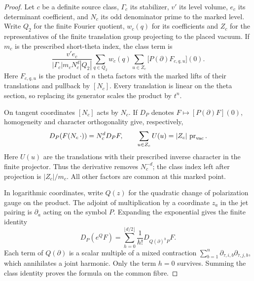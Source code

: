 \begin{proof}
Let \(c\) be a definite source class, \(\Gamma_c\) its stabilizer,
\(v'\) its level volume, \(e_c\) its determinant coefficient,
and \(N_c\) its odd denominator prime to the marked level. Write
\(Q_2\) for the finite Fourier quotient, \(w_c(q)\) for its
coefficients and \(Z_c\) for the representatives of the finite
translation group projecting to the placed vacuum. If \(m_c\)
is the prescribed short-theta index, the class term is
\[
 \frac{v'e_c}{|\Gamma_c|m_cN_c^{d}|Q_2|}
 \sum_{q\in Q_2}w_c(q)\sum_{u\in Z_c}
                \bigl[P(\partial)F_{c,q,u}\bigr](0).
\]
Here \(F_{c,q,u}\) is the product of \(n\) theta factors
with the marked lifts of their translations and pullback by
\([N_c]\). Every translation is linear on the theta section,
so replacing its generator scales the product by \(t^n\).

On tangent coordinates \([N_c]\) acts by \(N_c\). If \(D_P\)
denotes \(F\mapsto[P(\partial)F](0)\), homogeneity and character
orthogonality give, respectively,
\[
 D_P(F(N_c\,\cdot))=N_c^dD_PF,\qquad
 \sum_{u\in Z_c}U(u)=|Z_c|\,\operatorname{pr}_{\rm vac}.
\]
Here \(U(u)\) are the translations with their prescribed inverse
character in the finite projector. Thus the derivative removes
\(N_c^{-d}\); the class index left after projection is
\(|Z_c|/m_c\). All other factors are common at this marked point.

In logarithmic coordinates, write \(Q(z)\) for the quadratic
change of polarization gauge on the product. The adjoint of
multiplication by a coordinate \(z_a\) in the jet pairing is
\(\partial_a\) acting on the symbol \(P\). Expanding the
exponential gives the finite identity
\[
 D_P(e^Q F)=
    \sum_{h=0}^{\lfloor d/2\rfloor}
       \frac{1}{h!}D_{Q(\partial)^hP}F .
\]
Each term of \(Q(\partial)\) is a scalar multiple of a mixed
contraction \(\sum_{b=1}^n\partial_{\tau,i,b}
\partial_{\bar\tau,j,b}\), which annihilates a joint harmonic.
Only the term \(h=0\) survives. Summing the class identity
proves the formula on the common fibre.
\end{proof}

